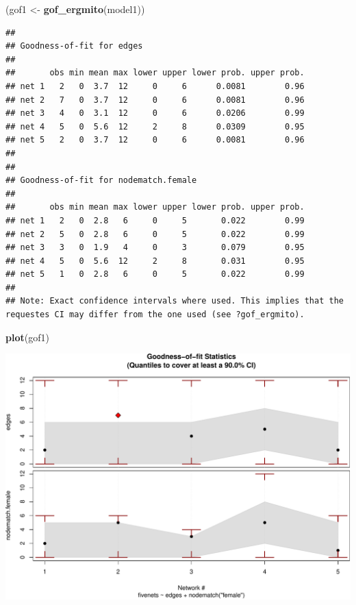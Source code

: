 \documentclass[10pt,ignorenonframetext,aspectratio=169,]{beamer}
\newenvironment{Shaded}{\begin{snugshade}}{\end{snugshade}}
\newcommand{\KeywordTok}[1]{\textcolor[rgb]{0.13,0.29,0.53}{\textbf{#1}}}
\newcommand{\NormalTok}[1]{#1}
\newcommand{\StringTok}[1]{\textcolor[rgb]{0.31,0.60,0.02}{#1}}
\begin{document}
\begin{frame}[fragile]

\scriptsize

\begin{Shaded}
\begin{Highlighting}[]
\NormalTok{(gof1 <-}\StringTok{ }\KeywordTok{gof_ergmito}\NormalTok{(model1))}
\end{Highlighting}
\end{Shaded}

\begin{verbatim}
## 
## Goodness-of-fit for edges 
## 
##       obs min mean max lower upper lower prob. upper prob.
## net 1   2   0  3.7  12     0     6      0.0081        0.96
## net 2   7   0  3.7  12     0     6      0.0081        0.96
## net 3   4   0  3.1  12     0     6      0.0206        0.99
## net 4   5   0  5.6  12     2     8      0.0309        0.95
## net 5   2   0  3.7  12     0     6      0.0081        0.96
## 
## 
## Goodness-of-fit for nodematch.female 
## 
##       obs min mean max lower upper lower prob. upper prob.
## net 1   2   0  2.8   6     0     5       0.022        0.99
## net 2   5   0  2.8   6     0     5       0.022        0.99
## net 3   3   0  1.9   4     0     3       0.079        0.95
## net 4   5   0  5.6  12     2     8       0.031        0.95
## net 5   1   0  2.8   6     0     5       0.022        0.99
## 
## Note: Exact confidence intervals where used. This implies that the requestes CI may differ from the one used (see ?gof_ergmito).
\end{verbatim}

\normalsize

\end{frame}

\begin{frame}[fragile]

\scriptsize

\begin{Shaded}
\begin{Highlighting}[]
\KeywordTok{plot}\NormalTok{(gof1)}
\end{Highlighting}
\end{Shaded}

\begin{center}\includegraphics[width=.7\linewidth]{index_files/figure-beamer/gof-fivenets-print-1} \end{center}

\normalsize

\end{frame}
\end{document}
